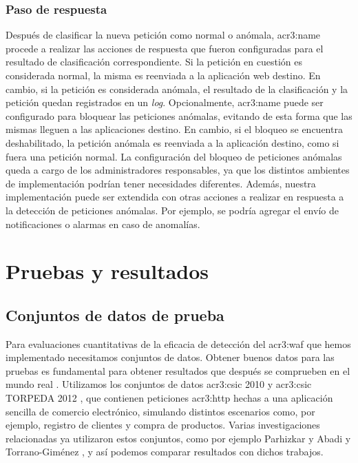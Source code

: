 \subsubsection{Paso de respuesta}

Después de clasificar la nueva petición como normal o anómala, \gls{acr3:name}
procede a realizar las acciones de respuesta que fueron configuradas para
el resultado de clasificación correspondiente.
Si la petición en cuestión es considerada normal, la misma es reenviada
a la aplicación web destino. En cambio, si la petición es considerada
anómala, el resultado de la clasificación y la petición quedan registrados
en un \textit{log}.
Opcionalmente, \gls{acr3:name} puede ser configurado para bloquear las
peticiones anómalas, evitando de esta forma que las mismas lleguen a las
aplicaciones destino. En cambio, si el bloqueo se encuentra deshabilitado,
la petición anómala es reenviada a la aplicación destino, como si fuera
una petición normal.
La configuración del bloqueo de peticiones anómalas queda a cargo de los
administradores responsables, ya que los distintos ambientes de implementación
podrían tener necesidades diferentes.
Además, nuestra implementación puede ser extendida con otras acciones
a realizar en respuesta a la detección de peticiones anómalas. Por ejemplo,
se podría agregar el envío de notificaciones o alarmas en caso de anomalías.


\section{Pruebas y resultados}
\label{chap:p3_results}

\subsection{Conjuntos de datos de prueba}

Para evaluaciones cuantitativas de la eficacia de detección del
\gls{acr3:waf} que hemos implementado necesitamos conjuntos de datos.
Obtener buenos datos para las pruebas es fundamental para obtener
resultados que después se comprueben en el mundo real
\cite{torranoGimenez2015study}.
Utilizamos los conjuntos de datos \gls{acr3:csic} 2010
\cite{csic2010dataset} y \gls{acr3:csic} TORPEDA 2012 \cite{torpeda2012dataset},
que contienen peticiones
\gls{acr3:http} hechas a una aplicación sencilla de comercio electrónico,
simulando distintos escenarios como, por ejemplo, registro de clientes
y compra de productos.
Varias investigaciones relacionadas ya utilizaron estos conjuntos, como
por ejemplo Parhizkar y Abadi \cite{parhizkar2015oc}
y Torrano-Giménez \cite{torranoGimenez2015study},
y así podemos comparar resultados con dichos trabajos.

